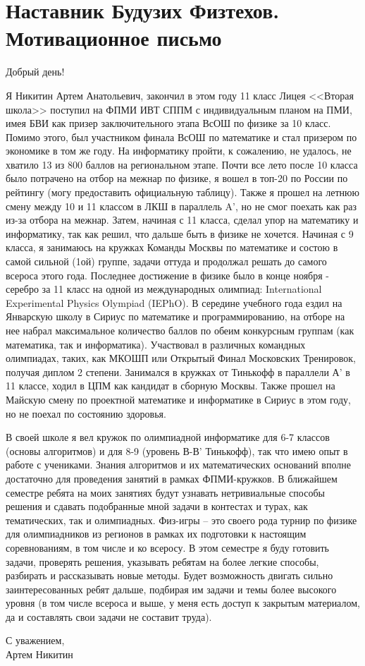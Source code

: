 \section{\textbf{Наставник Будузих Физтехов. Мотивационное письмо}}
\smallskip

\quad Добрый день!
\smallskip

\quad Я Никитин Артем Анатольевич, закончил в этом году 11 класс Лицея <<Вторая школа>> поступил на ФПМИ ИВТ СППМ с индивидуальным планом на
ПМИ, имея БВИ как призер заключительного этапа ВсОШ по физике за 10 класс. Помимо этого, был участником финала ВсОШ по математике и стал
призером по экономике в том же году. На информатику пройти, к сожалению, не удалось, не хватило 13 из 800 баллов на региональном этапе. Почти
все лето после 10 класса было потрачено на отбор на межнар по физике, я вошел в топ-20 по России по рейтингу (могу предоставить официальную
таблицу). Также я прошел на летнюю смену между 10 и 11 классом в ЛКШ в параллель A', но не смог поехать как раз из-за отбора на межнар. Затем,
начиная с 11 класса, сделал упор на математику и информатику, так как решил, что дальше быть в физике не хочется. Начиная с 9 класса, я
занимаюсь на кружках Команды Москвы по математике и состою в самой сильной (1ой) группе, задачи оттуда и продолжал решать до самого всероса
этого года. Последнее достижение в физике было в конце ноября - серебро за 11 класс на одной из международных олимпиад: International
Experimental Physics Olympiad (IEPhO). В середине учебного года ездил на Январскую школу в Сириус по математике и программированию, на отборе
на нее набрал максимальное количество баллов по обеим конкурсным группам (как математика, так и информатика). Участвовал в различных командных
олимпиадах, таких, как МКОШП или Открытый Финал Московских Тренировок, получая диплом 2 степени. Занимался в кружках от Тинькофф в параллели А'
в 11 классе, ходил в ЦПМ как кандидат в сборную Москвы. Также прошел на Майскую смену по проектной математике и информатике в Сириус в этом 
году, но не поехал по состоянию здоровья.

\quad В своей школе я вел кружок по олимпиадной информатике для 6-7 классов (основы алгоритмов) и для 8-9 (уровень В-В’ Тинькофф), так что имею
опыт в работе с учениками. Знания алгоритмов и их математических оснований вполне достаточно для проведения занятий в рамках ФПМИ-кружков. В
ближайшем семестре ребята на моих занятиях будут узнавать нетривиальные способы решения и сдавать подобранные мной задачи в контестах и турах,
как тематических, так и олимпиадных. Физ-игры – это своего рода турнир по физике для олимпиадников из регионов в рамках их подготовки к
настоящим соревнованиям, в том числе и ко всеросу. В этом семестре я буду готовить задачи, проверять решения, указывать ребятам на более легкие
способы, разбирать и рассказывать новые методы. Будет возможность двигать сильно заинтересованных ребят дальше, подбирая им задачи и темы более
высокого уровня (в том числе всероса и выше, у меня есть доступ к закрытым материалом, да и составлять свои задачи не составит труда). 

\begin{flushright}
    С уважением, \\
    Артем Никитин
\end{flushright}

